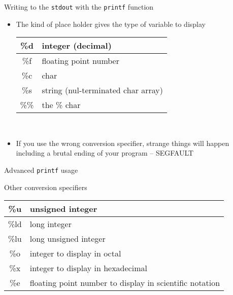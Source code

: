 \begin{Coupe}
\begin{frame}{Writing to the \texttt{stdout} with the \texttt{printf} function}
\begin{block}
\begin{itemize}
    \item The kind of place holder gives the type of variable to display
      \begin{center}
        \begin{tabular}{|c|l|}\hline
          \%d&integer (decimal)\\\hline
          \%f&floating point number\\\hline
          \%c&char\\\hline
          \%s&string (nul-terminated char array)\\\hline\hline
          \%\%&the \% char\\\hline
        \end{tabular}~~~~~~
      \end{center}
    \item If you use the wrong conversion specifier, strange things will happen \\
      {\small including a brutal ending of your program -- SEGFAULT}
    \end{itemize}
  \end{block}
\end{frame}
\begin{frame}{Advanced \texttt{printf} usage}
  \begin{block}{Other conversion specifiers} 
      \begin{center}
        \begin{tabular}{|c|l|}\hline
          \%u&unsigned integer\\\hline
          \%ld&long integer\\\hline
          \%lu&long unsigned integer\\\hline
          \%o&integer to display in octal\\\hline
          \%x&integer to display in hexadecimal\\\hline
          \%e&floating point number to display in scientific notation\\\hline
        \end{tabular}~~~~~~
      \end{center}
  \end{block}


\end{frame}
\end{Coupe}
